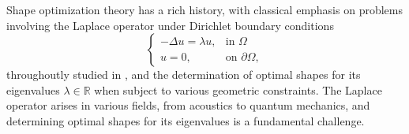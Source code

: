 \documentclass[5p,authoryear]{elsarticle}
\newtheorem{theorem}{Theorem}[subsection]
\begin{document}




Shape optimization theory has a rich history, with classical emphasis on problems involving the Laplace operator under Dirichlet boundary conditions
\begin{equation}\label{helm_equation}
	\begin{cases}
		-\Delta u = \lambda u, & \text{in } \Omega\\
		u = 0, & \text{on } \partial\Omega,
	\end{cases}
\end{equation}
throughoutly studied in \cite{henrot2006extremum}, and the determination of optimal shapes for its eigenvalues \(\lambda \in \mathbb{R}\) when subject to various geometric constraints. The Laplace operator arises in various fields, from acoustics to quantum mechanics, and determining optimal shapes for its eigenvalues is a fundamental challenge.
\end{document}
